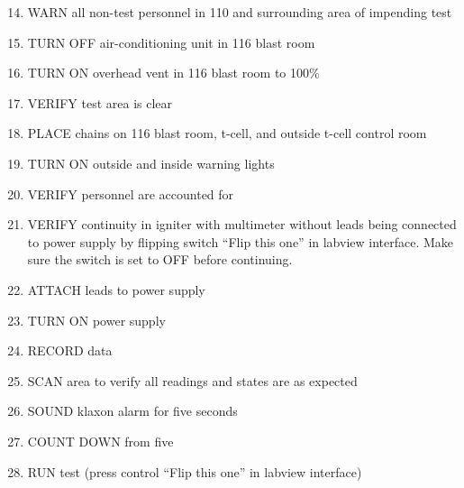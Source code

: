 \begin{enumerate}
    \setcounter{enumi}{13}
    \item WARN all non-test personnel in 110 and surrounding area of impending test
    \item TURN OFF air-conditioning unit in 116 blast room
    \item TURN ON overhead vent in 116 blast room to 100\%
    \item VERIFY test area is clear
    \item PLACE chains on 116 blast room, t-cell, and outside t-cell control room
    \item TURN ON outside and inside warning lights
    \item VERIFY personnel are accounted for
    \item VERIFY continuity in igniter with multimeter without leads being connected to power supply by flipping switch ``Flip this one'' in labview interface. Make sure the switch is set to OFF before continuing.
    \item ATTACH leads to power supply
    \item TURN ON power supply
    \item RECORD data
    \item SCAN area to verify all readings and states are as expected
    \item SOUND klaxon alarm for five seconds
    \item COUNT DOWN from five
    \item RUN test (press control ``Flip this one'' in labview interface)
\end{enumerate}

